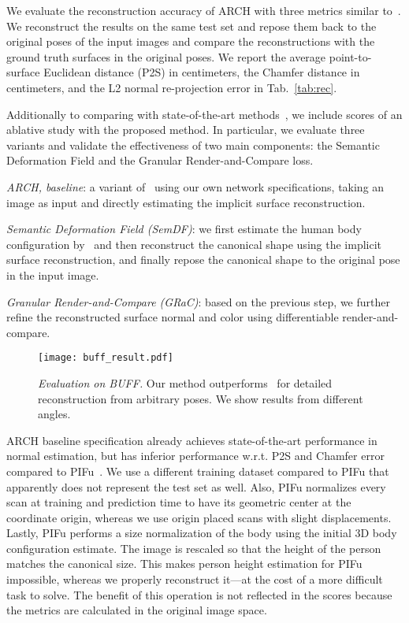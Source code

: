 \documentclass[10pt,twocolumn,letterpaper]{article}
\newcommand{\beforefigcaption}{\vspace{-4mm}}
\newcommand{\afterfigcaption}{\vspace{-4mm}}
\begin{document}
We evaluate the reconstruction accuracy of ARCH with three metrics similar to~\cite{PIFuICCV19}.
We reconstruct the results on the same test set and repose them back to the original poses of the input images and
compare the reconstructions with the ground truth surfaces in the original poses.
We report the average point-to-surface Euclidean distance (P2S) in centimeters, the Chamfer distance in centimeters,
and the L2 normal re-projection error in Tab.~\ref{tab:rec}.

Additionally to comparing with state-of-the-art methods~\cite{chen2018implicit_decoder,VolumeRegECCVW2018,kanazawa2018hmr,SiCloPeCVPR19,PIFuICCV19,varol18_bodynet}, we include scores of an ablative study with the proposed method. In particular, we evaluate three variants and validate the effectiveness of two main components: the Semantic Deformation Field and the Granular Render-and-Compare loss.

\textit{ARCH, baseline}: a variant of~\cite{PIFuICCV19} using our own network specifications, taking an image as input and directly estimating the implicit surface reconstruction. 

\textit{Semantic Deformation Field (SemDF)}: we first estimate the human body configuration by~\cite{DenseRaCICCV19} and then reconstruct the canonical shape using the implicit surface reconstruction, and finally repose the canonical shape to the original pose in the input image.

\textit{Granular Render-and-Compare (GRaC)}: based on the previous step, we further refine the reconstructed surface normal and color using differentiable render-and-compare.

\begin{figure}
\centering
\texttt{[image: buff\_result.pdf]}
\beforefigcaption
\caption{\textit{Evaluation on BUFF.} Our method outperforms~\cite{PIFuICCV19} for detailed reconstruction from arbitrary poses. We show results from different angles.}
\vspace{2mm}
\afterfigcaption
\label{fig:BUFF}
\end{figure}

ARCH baseline specification already achieves state-of-the-art performance in normal estimation, but has inferior performance w.r.t. P2S and Chamfer error compared to PIFu~\cite{PIFuICCV19}. We use a different training dataset compared to PIFu that apparently does not represent the test set as well. Also, PIFu normalizes every scan at training and prediction time to have its geometric center at the coordinate origin, whereas we use origin placed scans with slight displacements. Lastly, PIFu performs a size normalization of the body using the initial 3D body configuration estimate. The image is rescaled so that the height of the person matches the canonical size. This makes person height estimation for PIFu impossible, whereas we properly reconstruct it---at the cost of a more difficult task to solve. The benefit of this operation is not reflected in the scores because the metrics are calculated in the original image space.
\end{document}
